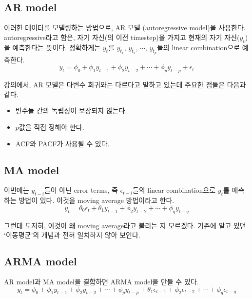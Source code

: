 \documentclass{article}
\begin{document}
%
\subsection{AR model}
이러한 데이터를 모델링하는 방법으로, AR 모델 (autoregressive model)을 사용한다.
autoregressive라고 함은, 자기 자신(의 이전 timestep)을 가지고 현재의 자기 자신($y_t$)을 예측한다는 뜻이다.
정확하게는 \(y_t\)를 \(y_{t_1}\), \(y_{t_2}\), \(\cdots\), \(y_{t_p}\)들의 linear combination으로 예측한다.
\[y_t = \phi_0+\phi_1y_{t-1}+\phi_2y_{t-2}+\cdots+\phi_py_{t-p}+\epsilon_t\]

강의에서, AR 모델은 다변수 회귀와는 다르다고 말하고 있는데 주요한 점들은 다음과 같다.
\begin{itemize}
\item
변수들 간의 독립성이 보장되지 않는다.
\item
\(p\)값을 직접 정해야 한다.
\item
ACF와 PACF가 사용될 수 있다.
\end{itemize}

%
\subsection{MA model}
이번에는 \(y_{t-i}\)들이 아닌 error terms, 즉 \(\epsilon_{t-i}\)들의 linear combination으로 \(y_t\)를 예측하는 방법이 있다.
이것을 moving average 방법이라고 한다.
\[y_t = \theta_0\epsilon_t+\theta_1y_{t-1}+\phi_2y_{t-2}+\cdots+\phi_qy_{t-q}\]

그런데 도저히, 이것이 왜 moving average라고 불리는 지 모르겠다.
기존에 알고 있던 `이동평균'의 개념과 전혀 일치하지 않아 보인다.

%
\subsection{ARMA model}
AR model과 MA model을 결합하면 ARMA model을 만들 수 있다.
\[y_t = \phi_0+\phi_1y_{t-1}+\phi_2y_{t-2}+\cdots+\phi_py_{t-p}+\theta_1\epsilon_{t-1}+\phi_2\epsilon_{t-2}+\cdots+\phi_q\epsilon_{t-q}\]

\end{document}
